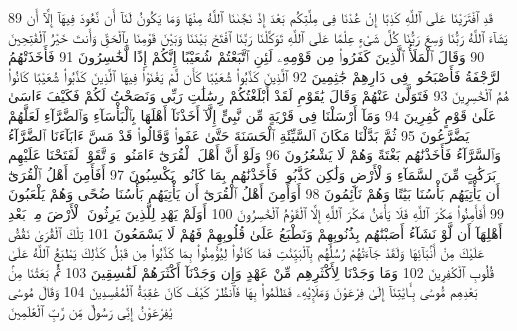 {\tiny\colorbox{cl_aya}{89}} قَدِ ٱفْتَرَيْنَا عَلَى ٱللَّهِ كَذِبًا إِنْ عُدْنَا فِى مِلَّتِكُم بَعْدَ إِذْ نَجَّىٰنَا ٱللَّهُ مِنْهَا وَمَا يَكُونُ لَنَآ أَن نَّعُودَ فِيهَآ إِلَّآ أَن يَشَآءَ ٱللَّهُ رَبُّنَا وَسِعَ رَبُّنَا كُلَّ شَىْءٍ عِلْمًا عَلَى ٱللَّهِ تَوَكَّلْنَا رَبَّنَا ٱفْتَحْ بَيْنَنَا وَبَيْنَ قَوْمِنَا بِٱلْحَقِّ وَأَنتَ خَيْرُ ٱلْفَٰتِحِينَ
{\tiny\colorbox{cl_aya}{90}} وَقَالَ ٱلْمَلَأُ ٱلَّذِينَ كَفَرُوا۟ مِن قَوْمِهِۦ لَئِنِ ٱتَّبَعْتُمْ شُعَيْبًا إِنَّكُمْ إِذًا لَّخَٰسِرُونَ
{\tiny\colorbox{cl_aya}{91}} فَأَخَذَتْهُمُ ٱلرَّجْفَةُ فَأَصْبَحُوا۟ فِى دَارِهِمْ جَٰثِمِينَ
{\tiny\colorbox{cl_aya}{92}} ٱلَّذِينَ كَذَّبُوا۟ شُعَيْبًا كَأَن لَّمْ يَغْنَوْا۟ فِيهَا ٱلَّذِينَ كَذَّبُوا۟ شُعَيْبًا كَانُوا۟ هُمُ ٱلْخَٰسِرِينَ
{\tiny\colorbox{cl_aya}{93}} فَتَوَلَّىٰ عَنْهُمْ وَقَالَ يَٰقَوْمِ لَقَدْ أَبْلَغْتُكُمْ رِسَٰلَٰتِ رَبِّى وَنَصَحْتُ لَكُمْ فَكَيْفَ ءَاسَىٰ عَلَىٰ قَوْمٍ كَٰفِرِينَ
{\tiny\colorbox{cl_aya}{94}} وَمَآ أَرْسَلْنَا فِى قَرْيَةٍ مِّن نَّبِىٍّ إِلَّآ أَخَذْنَآ أَهْلَهَا بِٱلْبَأْسَآءِ وَٱلضَّرَّآءِ لَعَلَّهُمْ يَضَّرَّعُونَ
{\tiny\colorbox{cl_aya}{95}} ثُمَّ بَدَّلْنَا مَكَانَ ٱلسَّيِّئَةِ ٱلْحَسَنَةَ حَتَّىٰ عَفَوا۟ وَّقَالُوا۟ قَدْ مَسَّ ءَابَآءَنَا ٱلضَّرَّآءُ وَٱلسَّرَّآءُ فَأَخَذْنَٰهُم بَغْتَةً وَهُمْ لَا يَشْعُرُونَ
{\tiny\colorbox{cl_aya}{96}} وَلَوْ أَنَّ أَهْلَ ٱلْقُرَىٰٓ ءَامَنُوا۟ وَٱتَّقَوْا۟ لَفَتَحْنَا عَلَيْهِم بَرَكَٰتٍ مِّنَ ٱلسَّمَآءِ وَٱلْأَرْضِ وَلَٰكِن كَذَّبُوا۟ فَأَخَذْنَٰهُم بِمَا كَانُوا۟ يَكْسِبُونَ
{\tiny\colorbox{cl_aya}{97}} أَفَأَمِنَ أَهْلُ ٱلْقُرَىٰٓ أَن يَأْتِيَهُم بَأْسُنَا بَيَٰتًا وَهُمْ نَآئِمُونَ
{\tiny\colorbox{cl_aya}{98}} أَوَأَمِنَ أَهْلُ ٱلْقُرَىٰٓ أَن يَأْتِيَهُم بَأْسُنَا ضُحًى وَهُمْ يَلْعَبُونَ
{\tiny\colorbox{cl_aya}{99}} أَفَأَمِنُوا۟ مَكْرَ ٱللَّهِ فَلَا يَأْمَنُ مَكْرَ ٱللَّهِ إِلَّا ٱلْقَوْمُ ٱلْخَٰسِرُونَ
{\tiny\colorbox{cl_aya}{100}} أَوَلَمْ يَهْدِ لِلَّذِينَ يَرِثُونَ ٱلْأَرْضَ مِنۢ بَعْدِ أَهْلِهَآ أَن لَّوْ نَشَآءُ أَصَبْنَٰهُم بِذُنُوبِهِمْ وَنَطْبَعُ عَلَىٰ قُلُوبِهِمْ فَهُمْ لَا يَسْمَعُونَ
{\tiny\colorbox{cl_aya}{101}} تِلْكَ ٱلْقُرَىٰ نَقُصُّ عَلَيْكَ مِنْ أَنۢبَآئِهَا وَلَقَدْ جَآءَتْهُمْ رُسُلُهُم بِٱلْبَيِّنَٰتِ فَمَا كَانُوا۟ لِيُؤْمِنُوا۟ بِمَا كَذَّبُوا۟ مِن قَبْلُ كَذَٰلِكَ يَطْبَعُ ٱللَّهُ عَلَىٰ قُلُوبِ ٱلْكَٰفِرِينَ
{\tiny\colorbox{cl_aya}{102}} وَمَا وَجَدْنَا لِأَكْثَرِهِم مِّنْ عَهْدٍ وَإِن وَجَدْنَآ أَكْثَرَهُمْ لَفَٰسِقِينَ
{\tiny\colorbox{cl_aya}{103}} ثُمَّ بَعَثْنَا مِنۢ بَعْدِهِم مُّوسَىٰ بِـَٔايَٰتِنَآ إِلَىٰ فِرْعَوْنَ وَمَلَإِي۟هِۦ فَظَلَمُوا۟ بِهَا فَٱنظُرْ كَيْفَ كَانَ عَٰقِبَةُ ٱلْمُفْسِدِينَ
{\tiny\colorbox{cl_aya}{104}} وَقَالَ مُوسَىٰ يَٰفِرْعَوْنُ إِنِّى رَسُولٌ مِّن رَّبِّ ٱلْعَٰلَمِينَ
